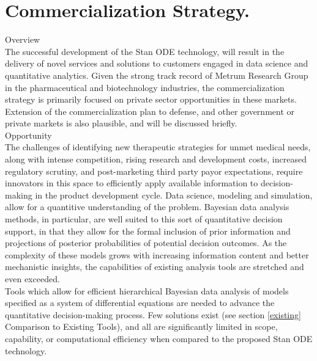 \documentclass[11pt]{nih2016}
\begin{document}
\section{Commercialization Strategy.}


\noindent
{\sc Overview}
\\[2pt]
The successful development of the Stan ODE technology, will result in
the delivery of novel services and solutions to customers engaged in
data science and quantitative analytics. Given the strong track record
of Metrum Research Group in the pharmaceutical and biotechnology
industries, the commercialization strategy is primarily focused on
private sector opportunities in these markets. Extension of the
commercialization plan to defense, and other government or private
markets is also plausible, and will be discussed briefly.
\\

\noindent
{\sc Opportunity}
\\[2pt]
The challenges of identifying new therapeutic strategies for unmet
medical needs, along with intense competition, rising research and
development costs, increased regulatory scrutiny, and post-marketing
third party payor expectations, require innovators in this space to
efficiently apply available information to decision-making in the
product development cycle. Data science, modeling and simulation,
allow for a quantitive understanding of the problem. Bayesian data
analysis methods, in particular, are well suited to this sort of
quantitative decision support, in that they allow for the formal
inclusion of prior information and projections of posterior
probabilities of potential decision outcomes. As the complexity of
these models grows with increasing information content and better
mechanistic insights, the capabilities of existing analysis tools are
stretched and even exceeded.\\ 

\noindent
Tools which allow for efficient hierarchical Bayesian data analysis of
models specified as a system of differential equations are  needed to
advance the quantitative decision-making process. Few solutions exist
(see section \ref{existing} Comparison to Existing Tools), and all are
significantly limited in scope, capability, or computational
efficiency when compared to the proposed Stan ODE technology.\\ 
 
\end{document}
